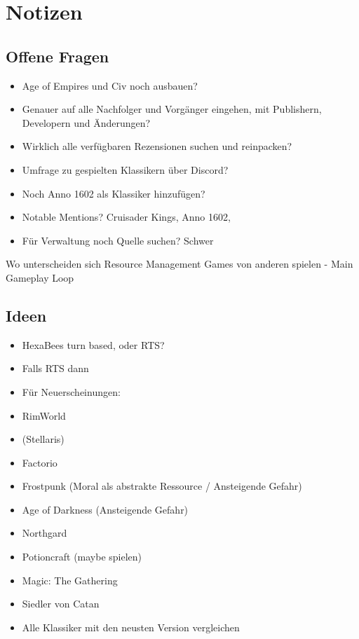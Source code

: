\section*{Notizen}
\subsection*{Offene Fragen}
\begin{itemize}
    \item Age of Empires und Civ noch ausbauen?
    \item Genauer auf alle Nachfolger und Vorgänger eingehen, mit Publishern, Developern und Änderungen?
    \item Wirklich alle verfügbaren Rezensionen suchen und reinpacken?
    \item Umfrage zu gespielten Klassikern über Discord?
    \item Noch Anno 1602 als Klassiker hinzufügen?
    \item Notable Mentions? Cruisader Kings, Anno 1602, 
    \item Für Verwaltung noch Quelle suchen? Schwer
\end{itemize}

Wo unterscheiden sich Resource Management Games von anderen spielen
- Main Gameplay Loop 

\subsection*{Ideen}
\begin{itemize}
    \item HexaBees turn based, oder RTS?
    \item Falls RTS dann 
    \item Für Neuerscheinungen:
    \item RimWorld
    \item (Stellaris)
    \item Factorio
    \item Frostpunk (Moral als abstrakte Ressource / Ansteigende Gefahr)
    \item Age of Darkness (Ansteigende Gefahr)
    \item Northgard
    \item Potioncraft (maybe spielen)
    \item Magic: The Gathering
    \item Siedler von Catan
    \item Alle Klassiker mit den neusten Version vergleichen
\end{itemize}

